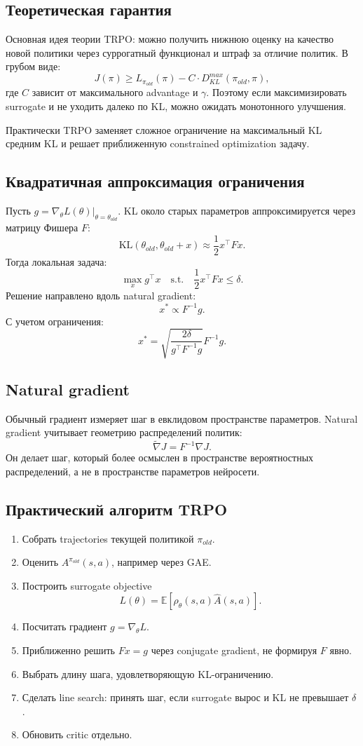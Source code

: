 \documentclass[11pt,a4paper]{article}
\newcommand{\E}{\mathbb{E}}
\newcommand{\KL}{\mathrm{KL}}
\newcommand{\1}{\mathbf{1}}
\begin{document}
\subsection*{Теоретическая гарантия}
Основная идея теории TRPO: можно получить нижнюю оценку на качество новой политики через суррогатный функционал и штраф за отличие политик. В грубом виде:
\[
    J(\pi)\ge L_{\pi_{old}}(\pi)-C\cdot D_{KL}^{max}(\pi_{old},\pi),
\]
где $C$ зависит от максимального advantage и $\gamma$. Поэтому если максимизировать surrogate и не уходить далеко по KL, можно ожидать монотонного улучшения.

Практически TRPO заменяет сложное ограничение на максимальный KL средним KL и решает приближенную constrained optimization задачу.

\subsection*{Квадратичная аппроксимация ограничения}
Пусть $g=\nabla_\theta L(\theta)|_{\theta=\theta_{old}}$. KL около старых параметров аппроксимируется через матрицу Фишера $F$:
\[
    \KL(\theta_{old},\theta_{old}+x)\approx \frac12x^\top F x.
\]
Тогда локальная задача:
\[
    \max_x g^\top x
    \quad\text{s.t.}\quad
    \frac12x^\top F x\le\delta.
\]
Решение направлено вдоль natural gradient:
\[
    x^* \propto F^{-1}g.
\]
С учетом ограничения:
\[
    x^*=\sqrt{\frac{2\delta}{g^\top F^{-1}g}}F^{-1}g.
\]

\subsection*{Natural gradient}
Обычный градиент измеряет шаг в евклидовом пространстве параметров. Natural gradient учитывает геометрию распределений политик:
\[
    \tilde\nabla J = F^{-1}\nabla J.
\]
Он делает шаг, который более осмыслен в пространстве вероятностных распределений, а не в пространстве параметров нейросети.

\subsection*{Практический алгоритм TRPO}
\begin{enumerate}
    \item Собрать trajectories текущей политикой $\pi_{old}$.
    \item Оценить $A^{\pi_{old}}(s,a)$, например через GAE.
    \item Построить surrogate objective
    \[
        L(\theta)=\E\left[\rho_\theta(s,a)\hat A(s,a)\right].
    \]
    \item Посчитать градиент $g=\nabla_\theta L$.
    \item Приближенно решить $Fx=g$ через conjugate gradient, не формируя $F$ явно.
    \item Выбрать длину шага, удовлетворяющую KL-ограничению.
    \item Сделать line search: принять шаг, если surrogate вырос и KL не превышает $\delta$.
    \item Обновить critic отдельно.
\end{enumerate}
\end{document}

